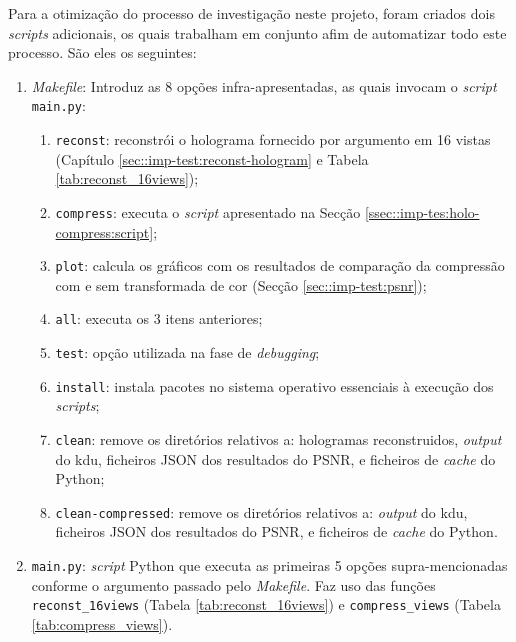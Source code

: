 Para a otimização do processo de investigação neste projeto, foram criados dois \textit{scripts} adicionais, os quais trabalham em conjunto afim de automatizar todo este processo. São eles os seguintes:
\begin{enumerate}
    \item \textit{Makefile}: Introduz as 8 opções infra-apresentadas, as quais invocam o \textit{script} \verb|main.py|: 
        \begin{enumerate}
            \item \verb|reconst|: reconstrói o holograma fornecido por argumento em 16 vistas (Capítulo \ref{sec::imp-test:reconst-hologram} e Tabela \ref{tab:reconst_16views});
            \item \verb|compress|: executa o \textit{script} apresentado na Secção \ref{ssec::imp-tes:holo-compress:script};
            \item \verb|plot|: calcula os gráficos com os resultados de comparação da   compressão com e sem transformada de cor (Secção \ref{sec::imp-test:psnr});
            \item \verb|all|: executa os 3 itens anteriores;
            \item \verb|test|: opção utilizada na fase de \textit{debugging};
            \item \verb|install|: instala pacotes no sistema operativo essenciais à execução dos \textit{scripts};
            \item \verb|clean|: remove os diretórios relativos a: hologramas reconstruidos, \textit{output} do \ac{kdu}, ficheiros JSON dos resultados do \ac{PSNR}, e ficheiros de \textit{cache} do Python;
            \item \verb|clean-compressed|: remove os diretórios relativos a: \textit{output} do \ac{kdu}, ficheiros JSON dos resultados do \ac{PSNR}, e ficheiros de \textit{cache} do Python.
        \end{enumerate}
    \item \verb|main.py|: \textit{script} Python que executa as primeiras 5 opções supra-mencionadas conforme o argumento passado pelo \textit{Makefile}. Faz uso das funções \verb|reconst_16views| (Tabela \ref{tab:reconst_16views}) e \verb|compress_views| (Tabela \ref{tab:compress_views}).
\end{enumerate}





